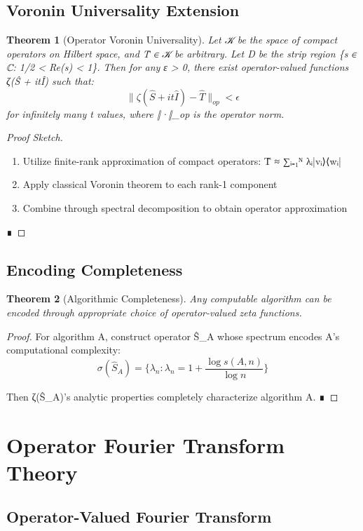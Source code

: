 \documentclass[12pt]{article}
\theoremstyle{plain}
\newtheorem{theorem}{Theorem}[section]
\theoremstyle{definition}
\begin{document}
\subsection{Voronin Universality Extension}

\begin{theorem}[Operator Voronin Universality]
Let 𝒦 be the space of compact operators on Hilbert space, and T̂ ∈ 𝒦 be arbitrary. Let D be the strip region \{s ∈ ℂ: 1/2 < Re(s) < 1\}. Then for any ε > 0, there exist operator-valued functions ζ(Ŝ + itÎ) such that:
$$\|\zeta(\hat{S} + it\hat{I}) - \hat{T}\|_{op} < \epsilon$$
for infinitely many t values, where ‖·‖_{op} is the operator norm.
\end{theorem}

\begin{proof}[Proof Sketch]
\begin{enumerate}
\item Utilize finite-rank approximation of compact operators: T̂ ≈ ∑ᵢ₌₁ᴺ λᵢ|vᵢ⟩⟨wᵢ|
\item Apply classical Voronin theorem to each rank-1 component
\item Combine through spectral decomposition to obtain operator approximation
\end{enumerate} ∎
\end{proof}

\subsection{Encoding Completeness}

\begin{theorem}[Algorithmic Completeness]
Any computable algorithm can be encoded through appropriate choice of operator-valued zeta functions.
\end{theorem}

\begin{proof}
For algorithm A, construct operator Ŝ_A whose spectrum encodes A's computational complexity:
$$\sigma(\hat{S}_A) = \{\lambda_n: \lambda_n = 1 + \frac{\log s(A,n)}{\log n}\}$$

Then ζ(Ŝ_A)'s analytic properties completely characterize algorithm A. ∎
\end{proof}

\section{Operator Fourier Transform Theory}

\subsection{Operator-Valued Fourier Transform}
\end{document}
